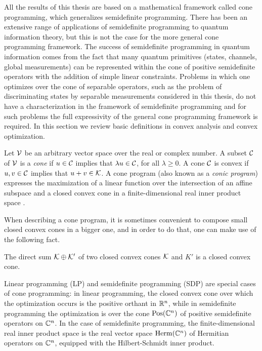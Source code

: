 All the results of this thesis are based on a mathematical framework 
called cone programming, which generalizes semidefinite programming.
There has been an extensive range of applications of semidefinite programming
to quantum information theory, but this is not the case for  
the more general cone programming framework. 
The success of semidefinite programming in quantum information comes from the fact 
that many quantum primitives (states, channels, global measurements) 
can be represented within the cone of positive semidefinite operators with the addition of 
simple linear constraints. 
Problems in which one optimizes over the cone of separable operators, such as 
the problem of discriminating states by separable measurements considered in this thesis, 
do not have a characterization in the framework of semidefinite programming and 
for such problems the full expressivity of the general cone programming framework is required.  
In this section we review basic definitions in convex analysis and convex optimization.

Let $\mathcal{V}$ be an arbitrary vector space over the real or complex number.
A subset $\mathcal{C}$ of $\mathcal{V}$ is a \emph{cone} if $u\in\mathcal{C}$ implies that $\lambda u \in \mathcal{C}$,
for all $\lambda \geq 0$. A cone $\mathcal{C}$ is convex if $u,v\in\mathcal{C}$ implies that
$u + v \in \mathcal{K}$.
A cone program (also known as a \emph{conic program}) expresses the
maximization of a linear function over the intersection of an affine subspace
and a closed convex cone in a finite-dimensional real inner product
space \cite{Boyd04}. 

When describing a cone program, it is sometimes convenient to compose small closed convex 
cones in a bigger one, and in order to do that, one can make use of the following fact. 
\begin{fact}
\label{fact:direct-sum-closed}
The direct sum $\mathcal{K} \oplus \mathcal{K}'$ of two closed convex cones $\mathcal{K}$ and $K'$ is a 
closed convex cone. 
\end{fact}

Linear programming (LP) and semidefinite programming (SDP) are special cases of cone
programming: in linear programming, the closed convex cone over which the
optimization occurs is the positive orthant in $\mathbb{R}^n$, while in semidefinite
programming the optimization is over the cone $\mathrm{Pos}(\mathbb{C}^n)$ of positive
semidefinite operators on $\mathbb{C}^n$.
In the case of semidefinite programming, the finite-dimensional real inner
product space is the real vector space $\mathrm{Herm}(\mathbb{C}^n)$ of Hermitian
operators on $\mathbb{C}^n$, equipped with the Hilbert-Schmidt inner product.

